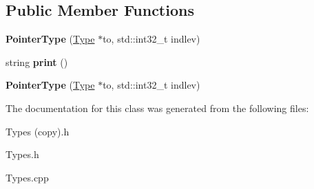 \subsection*{Public Member Functions}
\begin{DoxyCompactItemize}
\item 
\mbox{\label{classspan_1_1ir_1_1types_1_1PointerType_a827f13ff6a39e3542abe050c3512f88c}} 
{\bfseries Pointer\+Type} (\hyperlink{classspan_1_1ir_1_1types_1_1Type}{Type} $\ast$to, std\+::int32\+\_\+t indlev)
\item 
\mbox{\label{classspan_1_1ir_1_1types_1_1PointerType_a4b6d752e57cba96da68bd981d76133f5}} 
string {\bfseries print} ()
\item 
\mbox{\label{classspan_1_1ir_1_1types_1_1PointerType_a6ae6f9cdde1be9d1b5c12d2f0a1be004}} 
{\bfseries Pointer\+Type} (\hyperlink{classspan_1_1ir_1_1types_1_1Type}{Type} $\ast$to, std\+::int32\+\_\+t indlev)
\end{DoxyCompactItemize}


The documentation for this class was generated from the following files\+:\begin{DoxyCompactItemize}
\item 
Types (copy).\+h\item 
Types.\+h\item 
Types.\+cpp\end{DoxyCompactItemize}
